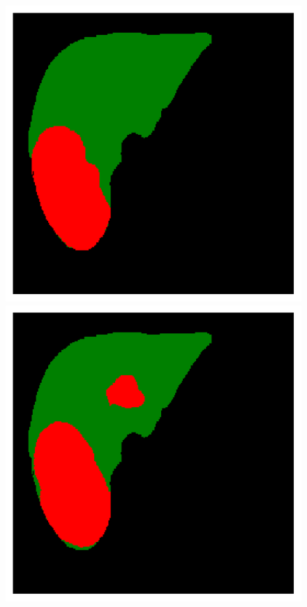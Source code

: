 \begin{figure}[!ht]
\begin{minipage}{4cm}
	\end{minipage} \hspace{-0.3cm}
	\begin{minipage}{4cm}
		\includegraphics[width=\linewidth]{images/ResizeTumorMult_GT_Pat0_4}
	\end{minipage} \hspace{-0.3cm}
	\begin{minipage}{4cm}
		\includegraphics[width=\linewidth]{images/ResizeTumorMult_Pred_Pat0_4}

\end{minipage}
\end{figure}
